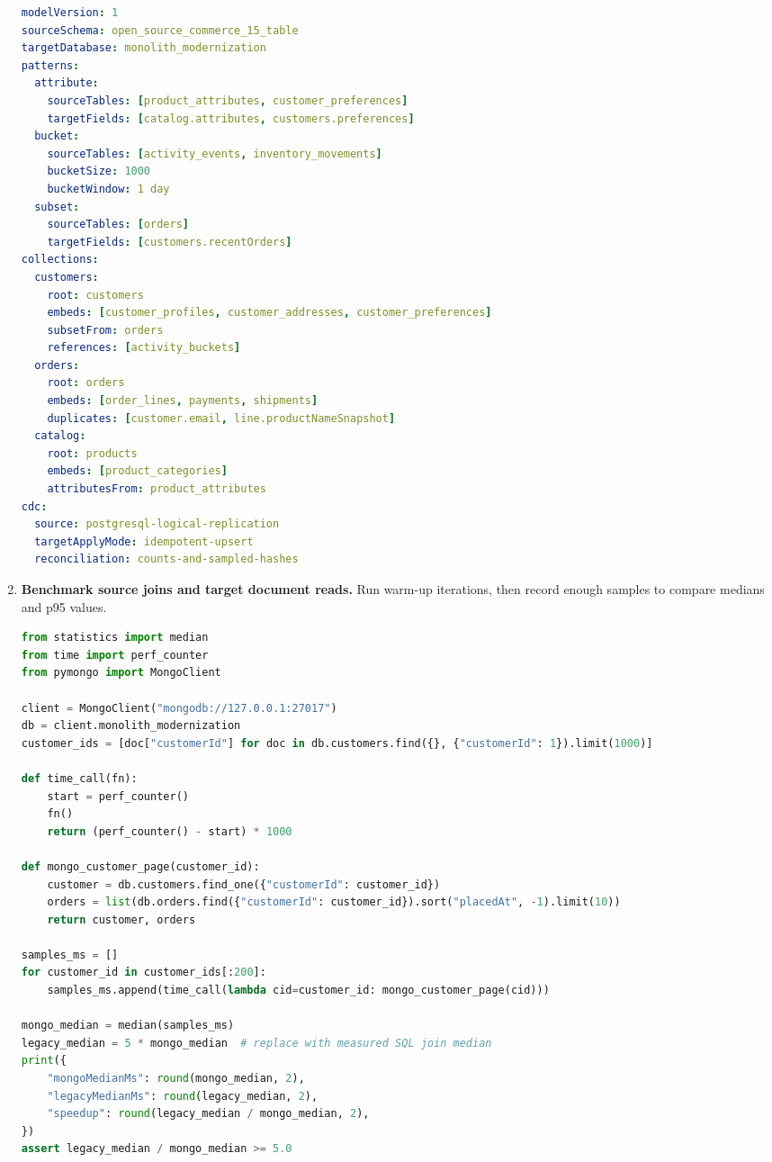 \begin{enumerate}
\begin{lstlisting}[language=yaml, caption={Capstone mapping excerpt with pattern annotations for review and Relational Migrator implementation.}]
modelVersion: 1
sourceSchema: open_source_commerce_15_table
targetDatabase: monolith_modernization
patterns:
  attribute:
    sourceTables: [product_attributes, customer_preferences]
    targetFields: [catalog.attributes, customers.preferences]
  bucket:
    sourceTables: [activity_events, inventory_movements]
    bucketSize: 1000
    bucketWindow: 1 day
  subset:
    sourceTables: [orders]
    targetFields: [customers.recentOrders]
collections:
  customers:
    root: customers
    embeds: [customer_profiles, customer_addresses, customer_preferences]
    subsetFrom: orders
    references: [activity_buckets]
  orders:
    root: orders
    embeds: [order_lines, payments, shipments]
    duplicates: [customer.email, line.productNameSnapshot]
  catalog:
    root: products
    embeds: [product_categories]
    attributesFrom: product_attributes
cdc:
  source: postgresql-logical-replication
  targetApplyMode: idempotent-upsert
  reconciliation: counts-and-sampled-hashes
\end{lstlisting}

    \item \textbf{Benchmark source joins and target document reads.} Run warm-up iterations, then record enough samples to compare medians and p95 values.

\begin{lstlisting}[language=Python, caption={Benchmark harness comparing a relational join endpoint with MongoDB document reads.}]
from statistics import median
from time import perf_counter
from pymongo import MongoClient

client = MongoClient("mongodb://127.0.0.1:27017")
db = client.monolith_modernization
customer_ids = [doc["customerId"] for doc in db.customers.find({}, {"customerId": 1}).limit(1000)]

def time_call(fn):
    start = perf_counter()
    fn()
    return (perf_counter() - start) * 1000

def mongo_customer_page(customer_id):
    customer = db.customers.find_one({"customerId": customer_id})
    orders = list(db.orders.find({"customerId": customer_id}).sort("placedAt", -1).limit(10))
    return customer, orders

samples_ms = []
for customer_id in customer_ids[:200]:
    samples_ms.append(time_call(lambda cid=customer_id: mongo_customer_page(cid)))

mongo_median = median(samples_ms)
legacy_median = 5 * mongo_median  # replace with measured SQL join median
print({
    "mongoMedianMs": round(mongo_median, 2),
    "legacyMedianMs": round(legacy_median, 2),
    "speedup": round(legacy_median / mongo_median, 2),
})
assert legacy_median / mongo_median >= 5.0
\end{lstlisting}
\end{enumerate}


